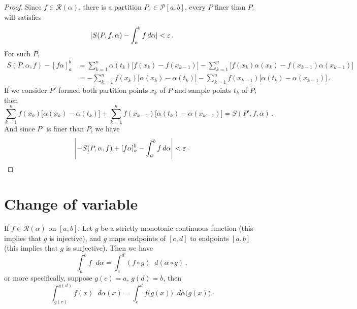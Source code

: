 \documentclass{article}
\newcommand{\Riemann}{\mathcal R}
\newcommand{\Partition}{\mathcal P}
\DeclarePairedDelimiter\abs{\lvert}{\rvert}
\newcommand{\dd}{\mathop{}\!d}
\begin{document}
\begin{proof}
    Since $ f \in \Riemann(\alpha) $, there is a partition $ P_\varepsilon \in \Partition[a, b] $, every $ P $ finer than $ P_\varepsilon $ will satisfies
    \[ 
        \abs{ S(P, f, \alpha) - \int_a^b f \dd \alpha } < \varepsilon \,.
    \]
    For such $ P $,
    \begin{align*}
        S(P, \alpha, f) - [f\alpha]_a^b & = \sum_{k=1}^{n} \alpha(t_k) \big[ f(x_k) - f(x_{k-1}) \big] - \sum_{k=1}^{n} \big[ f(x_k) \alpha(x_k) - f(x_{k-1}) \alpha(x_{k-1}) \big] \\
        &= - \sum_{k=1}^{n} f(x_k) \big[ \alpha(x_k) - \alpha(t_k) \big] - \sum_{k=1}^{n} f(x_{k-1}) \big[ \alpha(t_k) - \alpha(x_{k-1}) \big] \,.
    \end{align*}
    If we consider $ P' $ formed both partition points $ x_k $ of $ P $ and sample points $ t_k $ of $ P $, then
    \[ 
        \sum_{k=1}^{n} f(x_k) \big[ \alpha(x_k) - \alpha(t_k) \big] + \sum_{k=1}^{n} f(x_{k-1}) \big[ \alpha(t_k) - \alpha(x_{k-1}) \big] = S(P', f, \alpha) \,.
    \]
    And since $ P' $ is finer than $ P $, we have
    \[ 
        \abs*{ -S(P, \alpha, f) + [f\alpha]_a^b - \int_a^b f \dd \alpha } < \varepsilon \,.
    \]
\end{proof}

\section{Change of variable}
\begin{theorem} \label{thm:change-of-variable-general}
    If $ f \in \Riemann(\alpha) $ on $ [a, b] $. Let $ g $ be a strictly monotonic continuous function (this implies that $ g $ is injective), and $ g $ maps endpoints of $ [c, d] $ to endpoints $ [a, b] $ (this implies that $ g $ is surjective). Then we have
    \[
        \int_a^b f \dd \alpha = \int_c^d (f \circ g) \dd (\alpha \circ g) \,,
    \]
    or more specifically, suppose $ g(c) = a $, $ g(d) = b $, then
    \[ 
        \int_{g(c)}^{g(d)} f(x) \dd \alpha(x) = \int_{c}^{d} f \big( g(x) \big) \dd \alpha \big( g(x) \big) \,.
    \]
\end{theorem}
\end{document}
